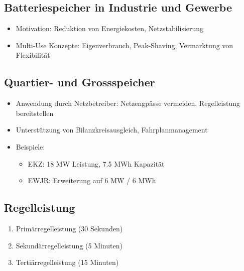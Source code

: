 \subsection{Batteriespeicher in Industrie und Gewerbe}
\begin{itemize}
    \item Motivation: Reduktion von Energiekosten, Netzstabilisierung
    \item Multi-Use Konzepte: Eigenverbrauch, Peak-Shaving, Vermarktung von Flexibilität
\end{itemize}

\subsection{Quartier- und Grossspeicher}
\begin{itemize}
    \item Anwendung durch Netzbetreiber: Netzengpässe vermeiden, Regelleistung bereitstellen
    \item Unterstützung von Bilanzkreisausgleich, Fahrplanmanagement
    \item Beispiele:
    \begin{itemize}
        \item EKZ: 18 MW Leistung, 7.5 MWh Kapazität
        \item EWJR: Erweiterung auf 6 MW / 6 MWh
    \end{itemize}
\end{itemize}

\subsection{Regelleistung}
\begin{enumerate}
    \item Primärregelleistung (30 Sekunden)
    \item Sekundärregelleistung (5 Minuten)
    \item Tertiärregelleistung (15 Minuten)
\end{enumerate}


























